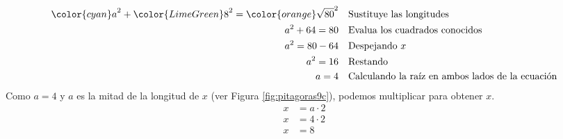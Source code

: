 \begin{solutionbox}{14cm}
\begin{minipage}{0.75\textwidth}
\begin{align*}
            {\color{cyan}a}^2+{\color{LimeGreen}8}^2  ={\color{orange}\sqrt{80}}^2 & \text{\quad Sustituye las longitudes}                         \\
            a^2+64   =80                                                           & \text{\quad Evalua los cuadrados conocidos}                   \\
            a^2=80-64                                                              & \text{\quad Despejando } x                                    \\
            a^2=16                                                                 & \text{\quad Restando}                                         \\
            a=4                                                                    & \text{\quad Calculando la raíz en ambos lados de la ecuación} \\
        \end{align*}
        Como $a=4$ y $a$ es la mitad de la longitud de $x$ (ver Figura \ref{fig:pitagoras9c}), podemos multiplicar para obtener $x$.
        \begin{align*}
            x & = a\cdot 2 \\
            x & = 4\cdot 2 \\
            x & = 8        \\
        \end{align*}
    \end{minipage}
\end{solutionbox}
